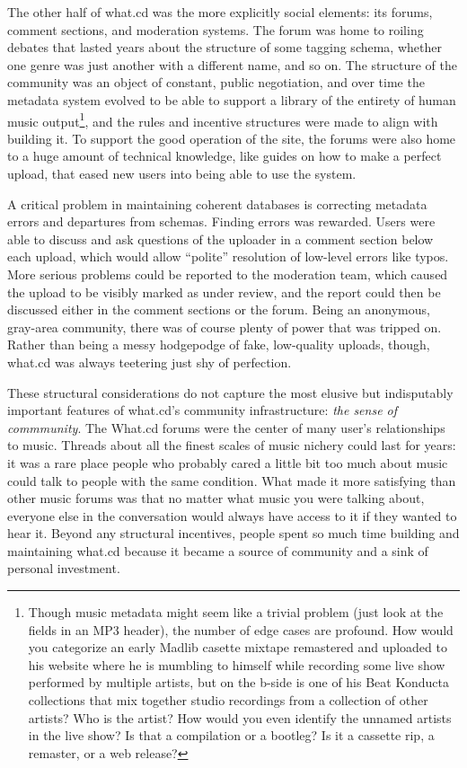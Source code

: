 \documentclass[notoc]{tufte-book}
\begin{document}
The other half of what.cd was the more explicitly social elements: its
forums, comment sections, and moderation systems. The forum was home to
roiling debates that lasted years about the structure of some tagging
schema, whether one genre was just another with a different name, and so
on. The structure of the community was an object of constant, public
negotiation, and over time the metadata system evolved to be able to
support a library of the entirety of human music output\footnote{Though
  music metadata might seem like a trivial problem (just look at the
  fields in an MP3 header), the number of edge cases are profound. How
  would you categorize an early Madlib casette mixtape remastered and
  uploaded to his website where he is mumbling to himself while
  recording some live show performed by multiple artists, but on the
  b-side is one of his Beat Konducta collections that mix together
  studio recordings from a collection of other artists? Who is the
  artist? How would you even identify the unnamed artists in the live
  show? Is that a compilation or a bootleg? Is it a cassette rip, a
  remaster, or a web release?}, and the rules and incentive structures
were made to align with building it. To support the good operation of
the site, the forums were also home to a huge amount of technical
knowledge, like guides on how to make a perfect upload, that eased new
users into being able to use the system.

A critical problem in maintaining coherent databases is correcting
metadata errors and departures from schemas. Finding errors was
rewarded. Users were able to discuss and ask questions of the uploader
in a comment section below each upload, which would allow ``polite''
resolution of low-level errors like typos. More serious problems could
be reported to the moderation team, which caused the upload to be
visibly marked as under review, and the report could then be discussed
either in the comment sections or the forum. Being an anonymous,
gray-area community, there was of course plenty of power that was
tripped on. Rather than being a messy hodgepodge of fake, low-quality
uploads, though, what.cd was always teetering just shy of perfection.

These structural considerations do not capture the most elusive but
indisputably important features of what.cd's community infrastructure:
\emph{the sense of commmunity}. The What.cd forums were the center of
many user's relationships to music. Threads about all the finest scales
of music nichery could last for years: it was a rare place people who
probably cared a little bit too much about music could talk to people
with the same condition. What made it more satisfying than other music
forums was that no matter what music you were talking about, everyone
else in the conversation would always have access to it if they wanted
to hear it. Beyond any structural incentives, people spent so much time
building and maintaining what.cd because it became a source of community
and a sink of personal investment.
\end{document}
